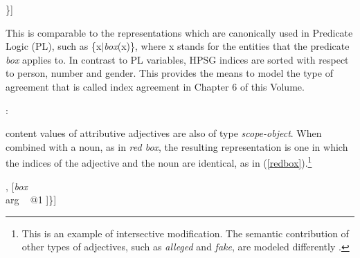 \documentclass[output=paper]{langsci/langscibook}
\begin{document}
\begin{exe} 
\ex\label{red} 
\begin{avm}
[{\it scope-obj\/}        \\
 index ~ @1 {\it index\/} \\
 restr ~ \{[{\it box\/}   \\
            arg ~ @1 ]\}]
\end{avm} 
\end{exe}

\noindent
This is comparable to the representations which are canonically used in 
Predicate Logic (PL), such as \{x$|${\it box\/}(x)\}, where x stands for 
the entities that the predicate {\it box\/} applies to. In contrast to 
PL variables, HPSG indices are sorted with respect to person, number 
and gender. This provides the means to model the type of agreement that 
is called index agreement in 
Chapter 6 of this Volume.

\begin{exe} 
 : \begin{avm}
                     \end{avm} 
\end{exe} 

{\sc content} values of attributive adjectives are also of type {\it scope-object}. 
When combined with a noun, as in {\it red box}, the resulting representation 
is one in which the indices of the adjective and the noun are identical, as in 
(\ref{redbox}).\footnote{This is an example of intersective modification. 
The semantic contribution of other types of adjectives, such as  
{\it alleged\/} and {\it fake}, are modeled differently \citep[330--331]{PS94}.}   

\begin{exe} 
\ex\label{redbox} 
\begin{avm}
[{\it scope-obj\/}         \\
 index ~ @1                \\
 restr ~ \{ [{\it red\/}   \\
             arg ~ @1 ] ,
            [{\it box\/}   \\
             arg ~ @1 ]\}]
\end{avm}
\end{exe}
\end{document}

